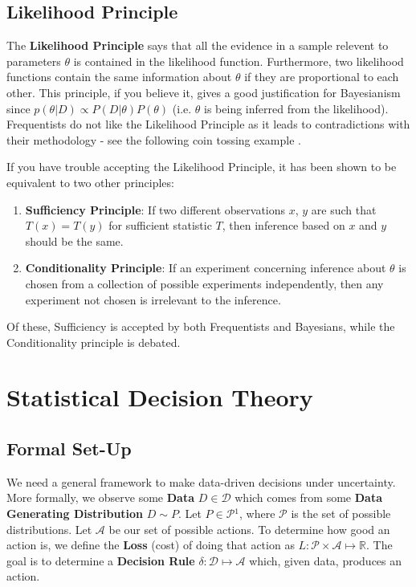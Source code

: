 \documentclass[]{article}
\begin{document}
\subsection{Likelihood Principle}

The \textbf{Likelihood Principle} says that all the evidence in a sample relevent to parameters \(\theta\) is contained in the likelihood function. Furthermore, two likelihood functions contain the same information about \(\theta\) if they
are proportional to each other.\cite{slides} This principle, if you believe it, gives a good justification for Bayesianism since \(p(\theta|D) \propto P(D|\theta)P(\theta)\) (i.e. $\theta$ is being inferred from the likelihood). Frequentists do not like the Likelihood Principle as it leads to contradictions with their methodology - see the following coin tossing example \cite{MJordanNotes}.

If you have trouble accepting the Likelihood Principle, it has been shown to be equivalent to two other principles:
\begin{enumerate}
	\item \textbf{Sufficiency Principle}: If two different observations $x$, $y$ are such that $T(x) = T(y)$ for sufficient statistic $T$, then inference based on $x$ and $y$ should be the same.
	\item \textbf{Conditionality Principle}: If an experiment concerning inference about $\theta$ is chosen from a collection of
	possible experiments independently, then any experiment not chosen is irrelevant to the inference.
\end{enumerate}

Of these, Sufficiency is accepted by both Frequentists and Bayesians, while the Conditionality principle is debated.


\section{Statistical Decision Theory}

\subsection{Formal Set-Up}

We need a general framework to make data-driven decisions under uncertainty. More formally, we observe some \textbf{Data} \(D \in \mathcal{D}\) which comes from some \textbf{Data Generating Distribution} \(D \sim P\). Let \(P\in \mathcal{P}\)\hyperref[sec:ft1]{$^1$}, where \(\mathcal{P}\) is the set of possible distributions. Let \(\mathcal{A}\) be our set of possible actions. To determine how good an action is, we define the \textbf{Loss} (cost) of doing that action as \(L: \mathcal{P} \times \mathcal{A} \mapsto \mathbb{R}\). The goal is to determine a \textbf{Decision Rule} \(\delta: \mathcal{D} \mapsto \mathcal{A}\) which, given data, produces an action.
\end{document}
